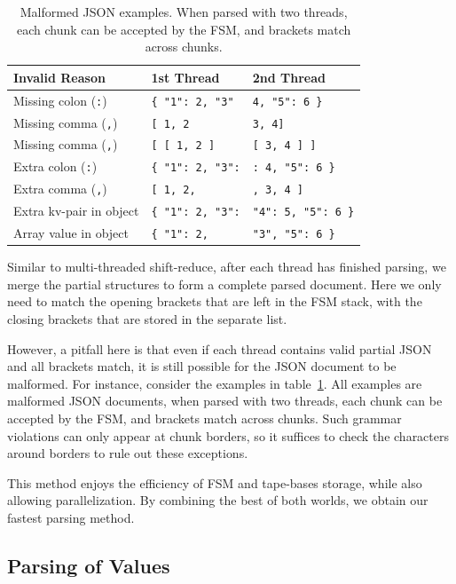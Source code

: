 \documentclass[11pt]{article}
\begin{document}
\begin{table}
\centering
\caption{Malformed JSON examples. When parsed with two threads, each chunk can be accepted by the FSM, and brackets match across chunks.}
\label{tab:parallel-fsm:malformed}
\begin{tabular}{lll}
\toprule
\bf Invalid Reason               & \bf 1st Thread        & \bf 2nd Thread          \\
\midrule
Missing colon (\verb|:|) & \verb|{ "1": 2, "3" | & \verb|4, "5": 6 }     | \\
Missing comma (\verb|,|) & \verb|[ 1, 2        | & \verb|3, 4]           | \\
Missing comma (\verb|,|) & \verb|[ [ 1, 2 ]    | & \verb|[ 3, 4 ] ]      | \\
Extra colon (\verb|:|)   & \verb|{ "1": 2, "3":| & \verb|: 4, "5": 6 }   | \\
Extra comma (\verb|,|)   & \verb|[ 1, 2,       | & \verb|, 3, 4 ]        | \\
Extra kv-pair in object  & \verb|{ "1": 2, "3":| & \verb|"4": 5, "5": 6 }| \\
Array value in object    & \verb|{ "1": 2,     | & \verb|"3", "5": 6 }   | \\
\bottomrule
\end{tabular}
\end{table}

Similar to multi-threaded shift-reduce, after each thread has finished parsing, we merge the partial structures to form a complete parsed document. Here we only need to match the opening brackets that are left in the FSM stack, with the closing brackets that are stored in the separate list.

However, a pitfall here is that even if each thread contains valid partial JSON and all brackets match, it is still possible for the JSON document to be malformed. For instance, consider the examples in table~\ref{tab:parallel-fsm:malformed}. All examples are malformed JSON documents, when parsed with two threads, each chunk can be accepted by the FSM, and brackets match across chunks. Such grammar violations can only appear at chunk borders, so it suffices to check the characters around borders to rule out these exceptions.

This method enjoys the efficiency of FSM and tape-bases storage, while also allowing parallelization. By combining the best of both worlds, we obtain our fastest parsing method.


\subsection{Parsing of Values}
\end{document}
